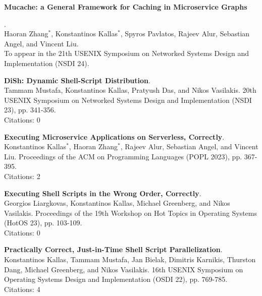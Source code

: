 \begin{minipage}{\textwidth}
\hypertarget{sec:publications}{\textbf{Mucache: a General Framework for Caching in Microservice Graphs}}. \\
Haoran Zhang$^*$, Konstantinos Kallas$^*$, Spyros Pavlatos, Rajeev Alur, Sebastian Angel, and Vincent Liu. \\
To appear in the 21th USENIX Symposium on Networked Systems Design and Implementation (NSDI 24). \\
\end{minipage}

\begin{minipage}{\textwidth}
\textbf{DiSh: Dynamic Shell-Script Distribution}. \\
Tammam Mustafa, Konstantinos Kallas, Pratyush Das, and Nikos Vasilakis.
20th USENIX Symposium on Networked Systems Design and Implementation (NSDI 23), pp. 341-356. \\
Citations: 0
\end{minipage}

\begin{minipage}{\textwidth}
\textbf{Executing Microservice Applications on Serverless, Correctly}. \\
Konstantinos Kallas$^*$, Haoran Zhang$^*$, Rajeev Alur, Sebastian Angel, and Vincent Liu.
Proceedings of the ACM on Programming Languages (POPL 2023), pp. 367-395. \\
Citations: 2
\end{minipage}

\begin{minipage}{\textwidth}
\textbf{Executing Shell Scripts in the Wrong Order, Correctly}. \\
Georgios Liargkovas, Konstantinos Kallas, Michael Greenberg, and Nikos Vasilakis.
Proceedings of the 19th Workshop on Hot Topics in Operating Systems (HotOS 23), pp. 103-109. \\
Citations: 0
\end{minipage}

\begin{minipage}{\textwidth}
\textbf{Practically Correct, Just-in-Time Shell Script Parallelization}. \\
Konstantinos Kallas, Tammam Mustafa, Jan Bielak, Dimitris Karnikis, Thurston Dang, Michael Greenberg, and Nikos Vasilakis.
16th USENIX Symposium on Operating Systems Design and Implementation (OSDI 22), pp. 769-785. \\
Citations: 4
\end{minipage}

